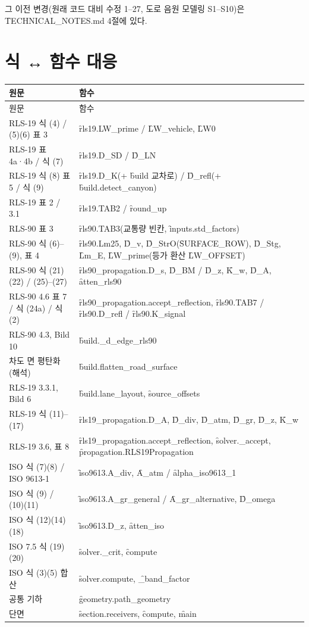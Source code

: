 \documentclass[10.5pt,a4paper]{article}
\begin{document}
그 이전 변경(원래 코드 대비 수정 1–27, 도로 음원 모델링 S1–S10)은 \f{TECHNICAL\_NOTES.md} 4절에 있다.

\appendix
\section{식 ↔ 함수 대응}
\begin{longtable}{P{52mm}P{100mm}}
\toprule 원문 & 함수 \\ \midrule\endfirsthead
\toprule 원문 & 함수 \\ \midrule\endhead
RLS-19 식 (4) / (5)(6) 표 3 & \f{rls19.LW\_prime} / \f{LW\_vehicle}, \f{LW0} \\
RLS-19 표 4a·4b / 식 (7) & \f{rls19.D\_SD} / \f{D\_LN} \\
RLS-19 식 (8) 표 5 / 식 (9) & \f{rls19.D\_K}(+ \f{build} 교차로) / \f{D\_refl}(+ \f{build.detect\_canyon}) \\
RLS-19 표 2 / 3.1 & \f{rls19.TAB2} / \f{round\_up} \\
RLS-90 표 3 & \f{rls90.TAB3}(교통량 빈칸, \f{inputs.std\_factors}) \\
RLS-90 식 (6)–(9), 표 4 & \f{rls90.Lm25}, \f{D\_v}, \f{D\_StrO}(\f{SURFACE\_ROW}), \f{D\_Stg}, \f{Lm\_E}, \f{LW\_prime}(등가 환산 \f{LW\_OFFSET}) \\
RLS-90 식 (21)(22) / (25)–(27) & \f{rls90\_propagation.D\_s}, \f{D\_BM} / \f{D\_z}, \f{K\_w}, \f{D\_A}, \f{atten\_rls90} \\
RLS-90 4.6 표 7 / 식 (24a) / 식 (2) & \f{rls90\_propagation.accept\_reflection}, \f{rls90.TAB7} / \f{rls90.D\_refl} / \f{rls90.K\_signal} \\
RLS-90 4.3, Bild 10 & \f{build.\_d\_edge\_rls90} \\
차도 면 평탄화(해석) & \f{build.flatten\_road\_surface} \\
RLS-19 3.3.1, Bild 6 & \f{build.lane\_layout}, \f{source\_offsets} \\
RLS-19 식 (11)–(17) & \f{rls19\_propagation.D\_A}, \f{D\_div}, \f{D\_atm}, \f{D\_gr}, \f{D\_z}, \f{K\_w} \\
RLS-19 3.6, 표 8 & \f{rls19\_propagation.accept\_reflection}, \f{solver.\_accept}, \f{propagation.RLS19Propagation} \\
ISO 식 (7)(8) / ISO 9613-1 & \f{iso9613.A\_div}, \f{A\_atm} / \f{alpha\_iso9613\_1} \\
ISO 식 (9) / (10)(11) & \f{iso9613.A\_gr\_general} / \f{A\_gr\_alternative}, \f{D\_omega} \\
ISO 식 (12)(14)(18) & \f{iso9613.D\_z}, \f{atten\_iso} \\
ISO 7.5 식 (19)(20) & \f{solver.\_crit}, \f{compute} \\
ISO 식 (3)(5) 합산 & \f{solver.compute}, \f{\_band\_factor} \\
공통 기하 & \f{geometry.path\_geometry} \\
단면 & \f{section.receivers}, \f{compute}, \f{main} \\
\bottomrule
\end{longtable}
\end{document}
